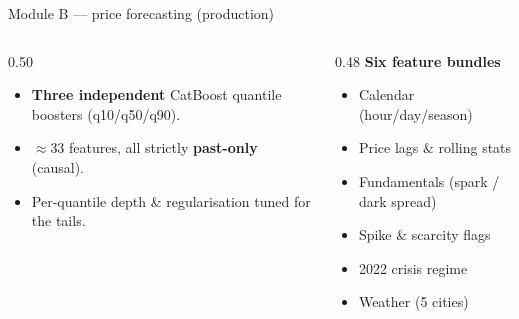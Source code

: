 \documentclass[aspectratio=169,11pt]{beamer}
\newcommand{\actname}{}
\newcommand{\actcolor}{emisAccent}
\newcommand{\setact}[2]{\renewcommand{\actname}{#1}\renewcommand{\actcolor}{#2}}
\begin{document}
\setact{Module B --- Price}{modB}
\begin{frame}{Module B --- price forecasting (production)}
  \begin{columns}[T,onlytextwidth]
    \begin{column}{0.50\textwidth}
      \small
      \begin{itemize}\setlength\itemsep{6pt}
        \item \textbf{Three independent} CatBoost quantile boosters (q10/q50/q90).
        \item $\approx$33 features, all strictly \textbf{past-only} (causal).
        \item Per-quantile depth \& regularisation tuned for the tails.
      \end{itemize}
    \end{column}
    \begin{column}{0.48\textwidth}
      \footnotesize
      \textbf{Six feature bundles}
      \begin{itemize}\setlength\itemsep{2pt}
        \item Calendar (hour/day/season)
        \item Price lags \& rolling stats
        \item Fundamentals (spark / dark spread)
        \item Spike \& scarcity flags
        \item 2022 crisis regime
        \item Weather (5 cities)
      \end{itemize}
    \end{column}
  \end{columns}
\end{frame}
\end{document}
